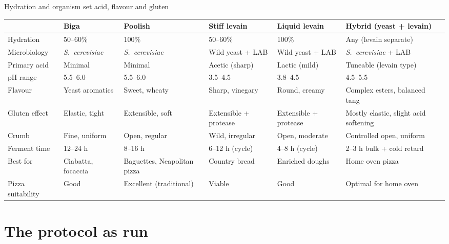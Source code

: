 \documentclass[aspectratio=169,11pt]{beamer}
\newcommand{\tablesetup}{\renewcommand{\arraystretch}{1.2}\setlength{\tabcolsep}{4pt}}
\newenvironment{tablebox}[1][\footnotesize]{\par\tablesetup#1}{\par}
\begin{document}
\begin{frame}{Hydration and organism set acid, flavour and gluten}
  \begin{tablebox}[\scriptsize\renewcommand{\arraystretch}{1.0}\setlength{\tabcolsep}{3pt}]
  \begin{tabularx}{\linewidth}{@{}L{1.85cm}L{2.05cm}L{2.35cm}L{2.15cm}L{2.15cm}Y@{}}
    \toprule
    & \textbf{Biga} & \textbf{Poolish} & \textbf{Stiff levain} & \textbf{Liquid levain} & \textbf{Hybrid (yeast + levain)} \\
    \midrule
    Hydration & 50--60\% & 100\% & 50--60\% & 100\% & Any (levain separate) \\
    Microbiology & \textit{S.~cerevisiae} & \textit{S.~cerevisiae} & Wild yeast + LAB & Wild yeast + LAB & \textit{S.~cerevisiae} + LAB \\
    Primary acid & Minimal & Minimal & Acetic (sharp) & Lactic (mild) & Tuneable (levain type) \\
    pH range & 5.5--6.0 & 5.5--6.0 & 3.5--4.5 & 3.8--4.5 & 4.5--5.5 \\
    Flavour & Yeast aromatics & Sweet, wheaty & Sharp, vinegary & Round, creamy & Complex esters, balanced tang \\
    Gluten effect & Elastic, tight & Extensible, soft & Extensible + protease & Extensible + protease & Mostly elastic, slight acid softening \\
    Crumb & Fine, uniform & Open, regular & Wild, irregular & Open, moderate & Controlled open, uniform \\
    Ferment time & 12--24 h & 8--16 h & 6--12 h (cycle) & 4--8 h (cycle) & 2--3 h bulk + cold retard \\
    Best for & Ciabatta, focaccia & Baguettes, Neapolitan pizza & Country bread & Enriched doughs & Home oven pizza \\
    Pizza suitability & Good & Excellent (traditional) & Viable & Good & Optimal for home oven \\
    \bottomrule
  \end{tabularx}
  \end{tablebox}
\end{frame}

\section{The protocol as run}
\end{document}
